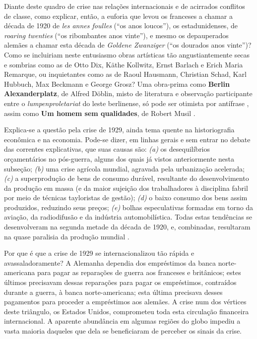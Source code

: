 Diante deste quadro de crise nas relações internacionais e de acirrados conflitos de classe, como explicar, então, a euforia que levou os franceses a chamar a década de 1920 de \textit{les annes foulles} (``os anos loucos''), os estadunidenses, de \textit{roaring twenties} (``os ribombantes anos vinte''), e mesmo os depauperados alemães a chamar esta década de \textit{Goldene Zwanziger} (``os dourados anos vinte'')? Como se incluiriam neste entusiasmo obras artísticas tão angustiantemente secas e sombrias como as de Otto Dix, Käthe Kollwitz, Ernst Barlach e Erich Maria Remarque, ou inquietantes como as de Raoul Hausmann, Christian Schad, Karl Hubbuch, Max Beckmann e George Grosz? Uma obra-prima como \textbf{Berlin Alexanderplatz}, de Alfred Döblin, misto de literatura e observação participante entre o \textit{lumpenproletariat} do leste berlinense, só pode ser otimista por antífrase \cite{doblin_alexanderplatz_2009}, assim como \textbf{Um homem sem qualidades}, de Robert Musil \cite{musil_quali_1989}.

Explica-se a questão pela crise de 1929, ainda tema quente na historiografia econômica e na economia. Pode-se dizer, em linhas gerais e sem entrar no debate das correntes explicativas, que suas causas são: \textit{(a)} os desequilíbrios orçamentários no pós-guerra, alguns dos quais já vistos anteriormente nesta subseção; \textit{(b)} uma crise agrícola mundial, agravada pela urbanização acelerada; \textit{(c)} a superprodução de bens de consumo durável, resultante do desenvolvimento da produção em massa (e da maior sujeição dos trabalhadores à disciplina fabril por meio de técnicas tayloristas de gestão); \textit{(d)} o baixo consumo dos bens assim produzidos, reduzindo seus preços; \textit{(e)} bolhas especulativas formadas em torno da aviação, da radiodifusão e da indústria automobilística. Todas estas tendências se desenvolveram na segunda metade da década de 1920, e, combinadas, resultaram na quase paralisia da produção mundial \cite{gazier_1929_2009,hautcoeur_1929_2009}.

Por que é que a crise de 1929 se internacionalizou tão rápida e avassaladoramente? A Alemanha dependia dos empréstimos da banca norte-americana para pagar as reparações de guerra aos franceses e britânicos; estes últimos precisavam dessas reparações para pagar os empréstimos, contraídos durante a guerra, à banca norte-americana; esta última precisava desses pagamentos para proceder a empréstimos aos alemães. A crise num dos vértices deste triângulo, os Estados Unidos, comprometeu toda esta circulação financeira internacional. A aparente abundância em algumas regiões do globo impediu a vasta maioria daqueles que dela se beneficiaram de perceber os sinais da crise.

